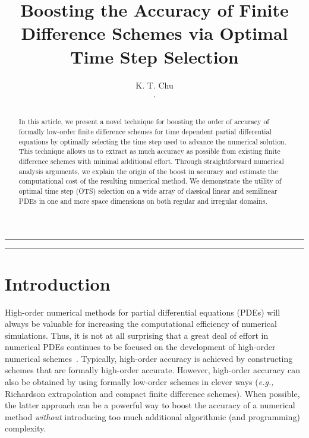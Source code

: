 \documentclass[fleqn,12pt,twoside]{article}
\def\eg{\emph{e.g., }}
\begin{document}


\title{Boosting the Accuracy of Finite Difference Schemes 
       via Optimal Time Step Selection}

\author{K. T. Chu\address{Vitamin D, Inc., Menlo Park, CA 94025}$^,$\address{Institute of High Performance Computing, A*STAR, Singapore, Singapore} 
}


\maketitle

\noindent \rule{6.3in}{1pt}

\begin{abstract}
In this article, we present a novel technique for boosting the order of 
accuracy of formally low-order finite difference schemes for time dependent 
partial differential equations by optimally selecting the time step used
to advance the numerical solution.  This technique allows us to extract as
much accuracy as possible from existing finite difference schemes with 
minimal additional effort.  Through straightforward numerical 
analysis arguments, we explain the origin of the boost in accuracy and 
estimate the computational cost of the resulting numerical 
method.  We demonstrate the utility of optimal time step (OTS) selection on a 
wide array of classical linear and semilinear PDEs in one and more space 
dimensions on both regular and irregular domains.  
\end{abstract}

\noindent \rule{6.3in}{1pt}


\section{Introduction}
High-order numerical methods for partial differential equations (PDEs) will 
always be valuable for increasing the computational efficiency of numerical 
simulations.  Thus, it is not at all surprising that a great deal of effort in 
numerical PDEs continues to be focused on the development of high-order 
numerical 
schemes~\cite{bruger_2005,gibou_2005,ito_2005,shukla_2005,shukla_2007}.  
Typically, high-order accuracy is achieved by constructing
schemes that are formally high-order accurate.  However, high-order 
accuracy can also be obtained by using formally low-order schemes in clever 
ways (\eg Richardson extrapolation and compact finite difference schemes).  
When possible, the latter approach can be a powerful way to boost the accuracy 
of a numerical method \emph{without} introducing too much additional 
algorithmic (and programming) complexity.
\end{document}
